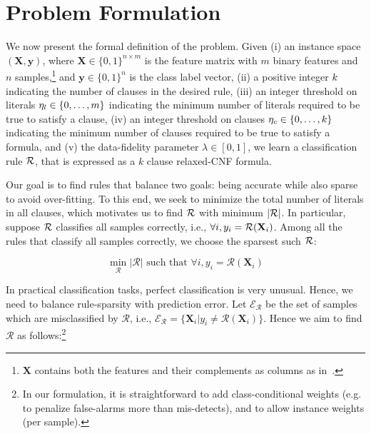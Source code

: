 \section{Problem Formulation}
\label{interpretability_crr_sec:problem}
We now present the formal definition of the problem. Given  (i) an instance space   $ (\mathbf{X}, \mathbf{y})$, where $ \mathbf{X} \in \{0,1\}^{n\times m} $ is the feature matrix with $ m $ binary features and $ n $ samples,\footnote{$\mathbf{X}$ contains both the features and their complements as columns as in~\cite{MV2013}.} and $ \mathbf{y} \in \{0,1\}^n $ is the class label vector, (ii) {a positive integer $ k $ indicating the number of clauses in the desired rule}, (iii)  an integer threshold on literals $ \eta_{l} \in  \{0,\dots,m\} $ indicating  the  minimum number of literals required to be true  to satisfy a clause, (iv)  an  integer threshold on clauses $ \eta_{c} \in  \{0,\dots,k\} $ indicating the minimum number of clauses required to be  true  to satisfy a formula, and  (v) the data-fidelity  parameter $ \lambda \in [0,1]$, we  learn  a classification rule $ {\mathcal{R}} $, that is expressed as a $ k $ clause relaxed-CNF formula. 


Our goal is to find rules that balance two 
goals:   being accurate while also sparse to avoid over-fitting.  
To this end, we seek to minimize the total number of literals in all clauses, which motivates us to  find $ {\mathcal{R}}  $ with minimum  $ |{\mathcal{R}}| $. In particular, suppose $ {\mathcal{R}} $ classifies all samples correctly, i.e., $ \forall i, y_i={\mathcal{R}}(\mathbf{X}_i) $. Among all the rules that classify all samples correctly,  we choose the sparsest  such $ {\mathcal{R}} $: 


\[
\min\limits_{\mathcal{R}} |\mathcal{R}|\text{ such that }\forall i, y_i=\mathcal{R}(\mathbf{X}_i)
\]



In practical classification tasks, perfect classification is very unusual. Hence, we need to balance rule-sparsity with prediction error.  Let $ \mathcal{E}_\mathcal{R} $   be  the set of samples which are misclassified  by $ \mathcal{R} $, i.e., $\mathcal{E}_\mathcal{R}=\{\mathbf{X}_i | y_i \ne \mathcal{R}(\mathbf{X}_i) \}$. Hence we aim to find $ \mathcal{R} $ as follows:\footnote{In our formulation, it is  straightforward to add class-conditional weights  (e.g. to penalize  false-alarms more than mis-detects), and to allow instance weights (per sample).}

